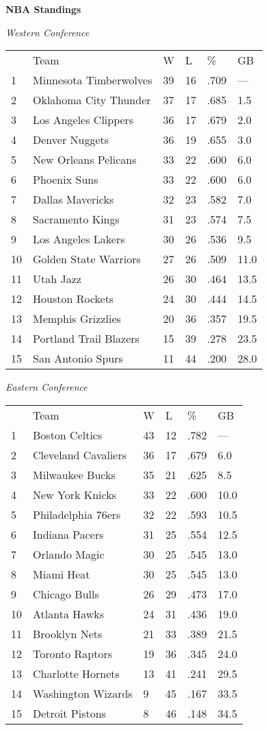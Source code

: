 \textbf{NBA Standings}

\textit{Western Conference}
\begin{tabular}{llllll}
 & Team & W & L & \% & GB \\
1 & Minnesota Timberwolves & 39 & 16 & .709 & — \\
2 & Oklahoma City Thunder & 37 & 17 & .685 & 1.5 \\
3 & Los Angeles Clippers & 36 & 17 & .679 & 2.0 \\
4 & Denver Nuggets & 36 & 19 & .655 & 3.0 \\
5 & New Orleans Pelicans & 33 & 22 & .600 & 6.0 \\
6 & Phoenix Suns & 33 & 22 & .600 & 6.0 \\
7 & Dallas Mavericks & 32 & 23 & .582 & 7.0 \\
8 & Sacramento Kings & 31 & 23 & .574 & 7.5 \\
9 & Los Angeles Lakers & 30 & 26 & .536 & 9.5 \\
10 & Golden State Warriors & 27 & 26 & .509 & 11.0 \\
11 & Utah Jazz & 26 & 30 & .464 & 13.5 \\
12 & Houston Rockets & 24 & 30 & .444 & 14.5 \\
13 & Memphis Grizzlies & 20 & 36 & .357 & 19.5 \\
14 & Portland Trail Blazers & 15 & 39 & .278 & 23.5 \\
15 & San Antonio Spurs & 11 & 44 & .200 & 28.0 \\
\end{tabular}


\textit{Eastern Conference}
\begin{tabular}{llllll}
 & Team & W & L & \% & GB \\
1 & Boston Celtics & 43 & 12 & .782 & — \\
2 & Cleveland Cavaliers & 36 & 17 & .679 & 6.0 \\
3 & Milwaukee Bucks & 35 & 21 & .625 & 8.5 \\
4 & New York Knicks & 33 & 22 & .600 & 10.0 \\
5 & Philadelphia 76ers & 32 & 22 & .593 & 10.5 \\
6 & Indiana Pacers & 31 & 25 & .554 & 12.5 \\
7 & Orlando Magic & 30 & 25 & .545 & 13.0 \\
8 & Miami Heat & 30 & 25 & .545 & 13.0 \\
9 & Chicago Bulls & 26 & 29 & .473 & 17.0 \\
10 & Atlanta Hawks & 24 & 31 & .436 & 19.0 \\
11 & Brooklyn Nets & 21 & 33 & .389 & 21.5 \\
12 & Toronto Raptors & 19 & 36 & .345 & 24.0 \\
13 & Charlotte Hornets & 13 & 41 & .241 & 29.5 \\
14 & Washington Wizards & 9 & 45 & .167 & 33.5 \\
15 & Detroit Pistons & 8 & 46 & .148 & 34.5 \\
\end{tabular}


